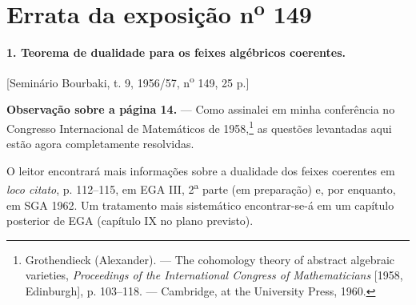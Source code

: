 \clearpage
\chapter*{Errata da exposição n\textsuperscript{o} 149}
\setcounter{footnote}{0}

\noindent\textbf{1. Teorema de dualidade para os feixes algébricos
coerentes.}

\begin{center}
[Seminário Bourbaki, t. 9, 1956/57, n\textsuperscript{o} 149, 25 p.]
\end{center}

\noindent\textbf{Observação sobre a página 14.} --- Como assinalei em minha
conferência no Congresso Internacional de Matemáticos de 1958,\footnote{
Grothendieck (Alexander). --- The cohomology theory of abstract algebraic
varieties, \emph{Proceedings of the International Congress of Mathematicians}
[1958, Edinburgh], p. 103--118. --- Cambridge, at the University Press, 1960.}
as questões levantadas aqui estão agora completamente resolvidas.

O leitor encontrará mais informações sobre a dualidade dos feixes
coerentes em \emph{loco citato}\footnotemark[1], p. 112--115, em EGA III,
2\textsuperscript{a} parte (em preparação) e, por enquanto, em SGA 1962.
Um tratamento mais sistemático encontrar-se-á em um capítulo posterior de EGA
(capítulo IX no plano previsto).
\par

\par
